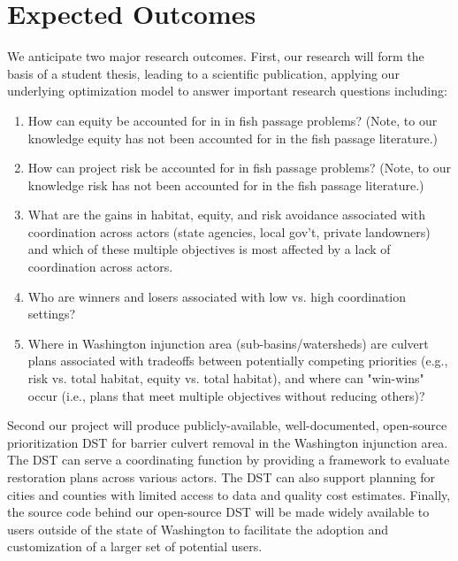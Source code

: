 \documentclass[12pt]{elsarticle}
\begin{document}


\section{Expected Outcomes} %

We anticipate two major research outcomes. First, our research will form the basis of a student thesis, leading to a scientific publication, applying our underlying optimization model to answer important research questions including:

\begin{enumerate}
\item How can equity be accounted for in in fish passage problems? (Note, to our knowledge equity has not been accounted for in the fish passage literature.)
\item How can project risk be accounted for in fish passage problems? (Note, to our knowledge risk has not been accounted for in the fish passage literature.)
\item What are the gains in habitat, equity, and risk avoidance associated with coordination across actors (state agencies, local gov't, private landowners) and which of these multiple objectives is most affected by a lack of coordination across actors.
\item Who are winners and losers associated with low vs. high coordination settings?
\item Where in Washington injunction area (sub-basins/watersheds) are culvert plans associated with tradeoffs between potentially competing priorities (e.g., risk vs. total habitat, equity vs. total habitat), and where can "win-wins" occur (i.e., plans that meet multiple objectives without reducing others)?
\end{enumerate}


Second our project will produce publicly-available, well-documented, open-source prioritization DST for barrier culvert removal in the Washington injunction area. The DST can serve a coordinating function by providing a framework to evaluate restoration plans across various actors. The DST can also support planning for cities and counties with limited access to data and quality cost estimates. Finally, the source code behind our open-source DST will be made widely available to users outside of the state of Washington to facilitate the adoption and customization of a larger set of potential users. 
\end{document}

